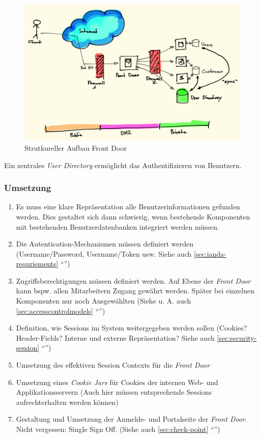 \begin{figure}[H]
	\centering
	\includegraphics[width=12cm]{content/secure-internet-applications/images/front-door.png}
	\caption{Strutkureller Aufbau Front Door}
\end{figure}

Ein zentrales \emph{User Directory} ermöglicht das Authentifizieren von Benutzern.

\subsubsection*{Umsetzung}
\begin{enumerate}
	\item Es muss eine klare Repräsentation alle Benutzerinformationen gefunden werden. Dies gestaltet sich dann schwierig, wenn bestehende Komponenten mit bestehenden Benutzerdatenbanken integriert werden müssen.
	\item Die Autentication-Mechanismen müssen definiert werden (Username/Password, Username/Token usw. Siehe auch \ref{sec:ianda-requriements} ``'')
	\item Zugriffsberechtigungen müssen definiert werden. Auf Ebene der \emph{Front Door} kann bspw. allen Mitarbeitern Zugang gewährt werden. Später bei einzelnen Komponenten nur noch Ausgewählten (Siehe u. A. auch \ref{sec:accesscontrolmodels} ``'')
	\item Definition, wie Sessions im System weitergegeben werden sollen (Cookies? Header-Fields? Interne und externe Repräsentation? Siehe auch \ref{sec:security-session} ``'')
	\item Umsetzung des effektiven Session Contexts für die \emph{Front Door}
	\item Umsetzung eines \emph{Cookie Jars} für Cookies der internen Web- und Applikationsservern (Auch hier müssen entsprechende Sessions aufrechterhalten werden können)
	\item Gestaltung und Umsetzung der Anmelde- und Portalseite der \emph{Front Door}. Nicht vergessen: Single Sign Off. (Siehe auch \ref{sec:check-point} ``'')
\end{enumerate}

